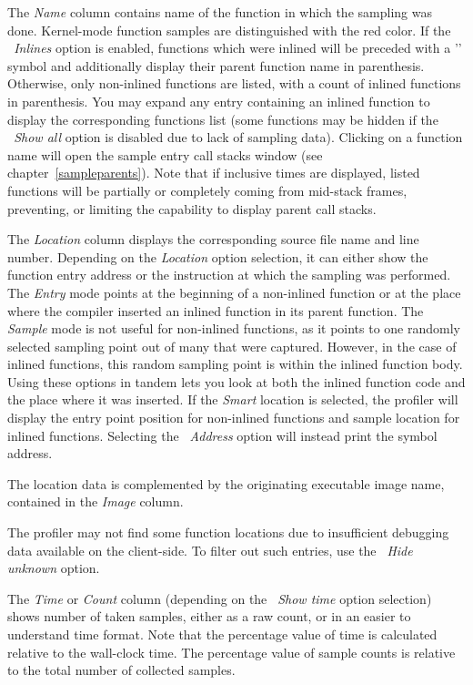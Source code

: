 \documentclass[hidelinks,titlepage,a4paper]{article}
\begin{document}
The \emph{Name} column contains name of the function in which the sampling was done. Kernel-mode function samples are distinguished with the red color. If the \emph{\faSitemap{}~Inlines} option is enabled, functions which were inlined will be preceded with a '\faCaretRight{}' symbol and additionally display their parent function name in parenthesis. Otherwise, only non-inlined functions are listed, with a count of inlined functions in parenthesis. You may expand any entry containing an inlined function to display the corresponding functions list (some functions may be hidden if the \emph{\faPuzzlePiece{}~Show all} option is disabled due to lack of sampling data). Clicking on a function name will open the sample entry call stacks window (see chapter~\ref{sampleparents}). Note that if inclusive times are displayed, listed functions will be partially or completely coming from mid-stack frames, preventing, or limiting the capability to display parent call stacks.

The \emph{Location} column displays the corresponding source file name and line number. Depending on the \emph{Location} option selection, it can either show the function entry address or the instruction at which the sampling was performed. The \emph{Entry} mode points at the beginning of a non-inlined function or at the place where the compiler inserted an inlined function in its parent function. The \emph{Sample} mode is not useful for non-inlined functions, as it points to one randomly selected sampling point out of many that were captured. However, in the case of inlined functions, this random sampling point is within the inlined function body. Using these options in tandem lets you look at both the inlined function code and the place where it was inserted. If the \emph{Smart} location is selected, the profiler will display the entry point position for non-inlined functions and sample location for inlined functions. Selecting the \emph{\faAt{}~Address} option will instead print the symbol address.

The location data is complemented by the originating executable image name, contained in the \emph{Image} column.

The profiler may not find some function locations due to insufficient debugging data available on the client-side. To filter out such entries, use the \emph{\faEyeSlash{}~Hide unknown} option.

The \emph{Time} or \emph{Count} column (depending on the \emph{\faStopwatch{}~Show time} option selection) shows number of taken samples, either as a raw count, or in an easier to understand time format. Note that the percentage value of time is calculated relative to the wall-clock time. The percentage value of sample counts is relative to the total number of collected samples.
\end{document}
